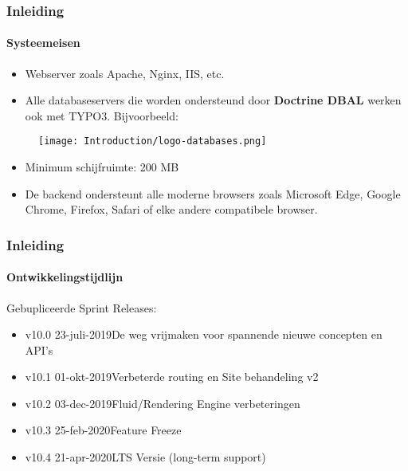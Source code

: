
\begin{frame}[fragile]
	\frametitle{Inleiding}
	\framesubtitle{Systeemeisen}

	\begin{itemize}
		\item Webserver zoals Apache, Nginx, IIS, etc.
		\item Alle databaseservers die worden ondersteund door \textbf{Doctrine DBAL}
			werken ook met TYPO3. Bijvoorbeeld:
	\end{itemize}

	\begin{figure}
		\texttt{[image: Introduction/logo-databases.png]}
	\end{figure}

	\begin{itemize}
		\item Minimum schijfruimte: 200 MB
		\item De backend ondersteunt alle moderne browsers zoals Microsoft Edge,
			Google Chrome, Firefox, Safari of elke andere compatibele browser.
	\end{itemize}

\end{frame}


\begin{frame}[fragile]
	\frametitle{Inleiding}
	\framesubtitle{Ontwikkelingstijdlijn}

	Gebupliceerde Sprint Releases:
	\vspace{0.4cm}
	\begin{itemize}
		\item v10.0 \tabto{1.1cm}23-juli-2019\tabto{3.4cm}De weg vrijmaken voor spannende nieuwe concepten en API's
		\item v10.1 \tabto{1.1cm}01-okt-2019\tabto{3.4cm}Verbeterde routing en Site behandeling v2
		\item v10.2 \tabto{1.1cm}03-dec-2019\tabto{3.4cm}Fluid/Rendering Engine verbeteringen
		\item v10.3 \tabto{1.1cm}25-feb-2020\tabto{3.4cm}Feature Freeze
		\item v10.4 \tabto{1.1cm}21-apr-2020\tabto{3.4cm}LTS Versie (long-term support)
	\end{itemize}

\end{frame}

